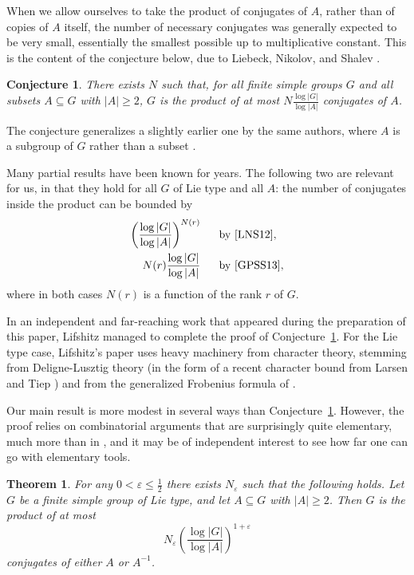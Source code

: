 \documentclass[a4paper]{article}
\newtheorem{theorem}[proposition]{Theorem}
\newtheorem{conjecture}[proposition]{Conjecture}
\theoremstyle{definition}
\numberwithin{equation}{section}
\begin{document}
When we allow ourselves to take the product of conjugates of $A$, rather than of copies of $A$ itself, the number of necessary conjugates was generally expected to be very small, essentially the smallest possible up to multiplicative constant. This is the content of the conjecture below, due to Liebeck, Nikolov, and Shalev \cite{LNS12}.

\begin{conjecture}\label{co:conjlns}
There exists $N$ such that, for all finite simple groups $G$ and all subsets $A\subseteq G$ with $|A|\geq 2$, $G$ is the product of at most $N\frac{\log|G|}{\log|A|}$ conjugates of $A$.
\end{conjecture}

The conjecture generalizes a slightly earlier one by the same authors, where $A$ is a subgroup of $G$ rather than a subset \cite{LNS10}.

Many partial results have been known for years. The following two are relevant for us, in that they hold for all $G$ of Lie type and all $A$: the number of conjugates inside the product can be bounded by
\begin{align}
\left(\frac{\log|G|}{\log|A|}\right)^{N(r)} & \text{\ \ \ \ \ by \cite[Thm.~1]{LNS12},} \label{eq:boundlns} \\
N(r)\frac{\log|G|}{\log|A|} & \text{\ \ \ \ \ by \cite[Thm.~1.3]{GPSS13},} \label{eq:boundgpss}
\end{align}
where in both cases $N(r)$ is a function of the rank $r$ of $G$.

In an independent and far-reaching work that appeared during the preparation of this paper, Lifshitz \cite{Lif24} managed to complete the proof of Conjecture~\ref{co:conjlns}. For the Lie type case, Lifshitz's paper uses heavy machinery from character theory, stemming from Deligne-Lusztig theory (in the form of a recent character bound from Larsen and Tiep \cite{LT24}) and from the generalized Frobenius formula of \cite{GLPS24}.

Our main result is more modest in several ways than Conjecture~\ref{co:conjlns}. However, the proof relies on combinatorial arguments that are surprisingly quite elementary, much more than in \cite{Lif24}, and it may be of independent interest to see how far one can go with elementary tools.

\begin{theorem}\label{th:main}
For any $0<\varepsilon\leq\frac{1}{2}$ there exists $N_{\varepsilon}$ such that the following holds. Let $G$ be a finite simple group of Lie type, and let $A\subseteq G$ with $|A|\geq 2$. Then $G$ is the product of at most
\begin{equation*}
N_{\varepsilon}\left(\frac{\log|G|}{\log|A|}\right)^{1+\varepsilon}
\end{equation*}
conjugates of either $A$ or $A^{-1}$.
\end{theorem}
\end{document}

